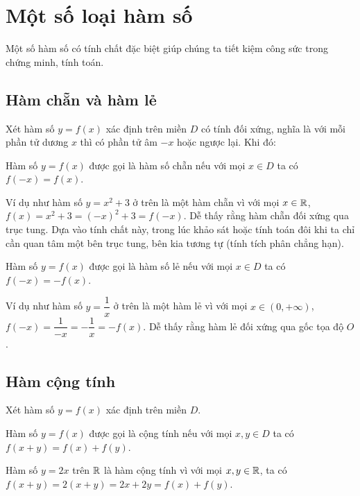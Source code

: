 \chapter{Một số loại hàm số}

Một số hàm số có tính chất đặc biệt giúp chúng ta tiết kiệm 
công sức trong chứng minh, tính toán.

\section{Hàm chẵn và hàm lẻ}

Xét hàm số $y=f(x)$ xác định trên miền $D$ có tính đối xứng, 
nghĩa là với mỗi phần tử dương $x$ thì có phần tử âm $-x$
hoặc ngược lại. Khi đó:

\begin{definition}
    Hàm số $y=f(x)$ được gọi là hàm số chẵn nếu với mọi $x \in D$
    ta có $f(-x) = f(x)$.
\end{definition}

Ví dụ như hàm số $y = x^2 + 3$ ở trên là một hàm chẵn vì với mọi
$x \in \mathbb{R}$, $f(x) = x^2 + 3 = (-x)^2 + 3 = f(-x)$. Dễ thấy rằng
hàm chẵn đối xứng qua trục tung. Dựa vào tính chất này, 
trong lúc khảo sát hoặc tính toán đôi khi ta chỉ cần quan tâm 
một bên trục tung, bên kia tương tự (tính tích phân chẳng hạn).

\begin{definition}
    Hàm số $y=f(x)$ được gọi là hàm số lẻ nếu với mọi $x \in D$
    ta có $f(-x) = -f(x)$.
\end{definition}

Ví dụ như hàm số $y = \dfrac{1}{x}$ ở trên là một hàm lẻ vì với
mọi $x \in (0, +\infty)$, $f(-x) = \dfrac{1}{-x} = -\dfrac{1}{x} = 
-f(x)$. Dễ thấy rằng hàm lẻ đối xứng qua gốc tọa độ $O$.

\section{Hàm cộng tính}

Xét hàm số $y=f(x)$ xác định trên miền $D$. 

\begin{definition}
    Hàm số $y = f(x)$ được gọi là cộng tính nếu với mọi $x, y \in D$
    ta có $f(x+y) = f(x) + f(y)$.
\end{definition}

\begin{example}
    Hàm số $y = 2x$ trên $\mathbb{R}$ là hàm cộng tính vì với mọi $x, y \in \mathbb{R}$,
    ta có $f(x+y) = 2(x+y) = 2x + 2y = f(x) + f(y)$.
\end{example}

